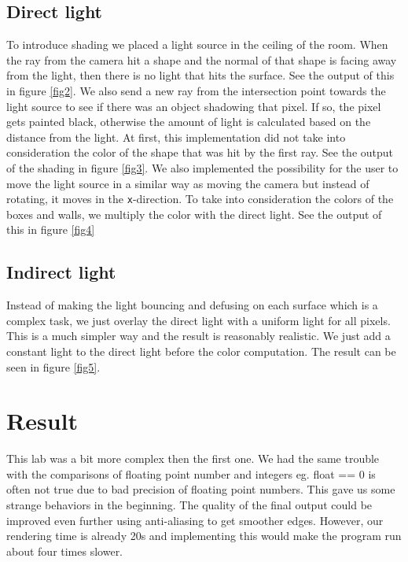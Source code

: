 \documentclass[a4paper,11pt]{article}
\begin{document}
\subsection{Direct light}
To introduce shading we placed a light source in the ceiling of the room. When the ray from the camera hit a shape and the normal of that shape is facing away from the light, then there is no light that hits the surface. See the output of this in figure \ref{fig2}. We also send a new ray from the intersection point towards the light source to see if there was an object shadowing that pixel. If so, the pixel gets painted black, otherwise the amount of light is calculated based on the distance from the light. At first, this implementation did not take into consideration the color of the shape that was hit by the first ray. See the output of the shading in figure \ref{fig3}.
We also implemented the possibility for the user to move the light source in a similar way as moving the camera but instead of rotating, it moves in the \verb|x|-direction.
To take into consideration the colors of the boxes and walls, we multiply the color with the direct light. See the output of this in figure \ref{fig4}

\subsection{Indirect light}
Instead of making the light bouncing and defusing on each surface which is a complex task, we just overlay the direct light with a uniform light for all pixels. This is a much simpler way and the result is reasonably realistic. We just add a constant light to the direct light before the color computation. The result can be seen in figure \ref{fig5}. 

\section{Result}
This lab was a bit more complex then the first one. We had the same trouble with the comparisons of floating point number and integers eg. float == 0 is often not true due to bad precision of floating point numbers. This gave us some strange behaviors in the beginning. The quality of the final output could be improved even further using anti-aliasing to get smoother edges. However, our rendering time is already 20s and implementing this would make the program run about four times slower. 
\end{document}
